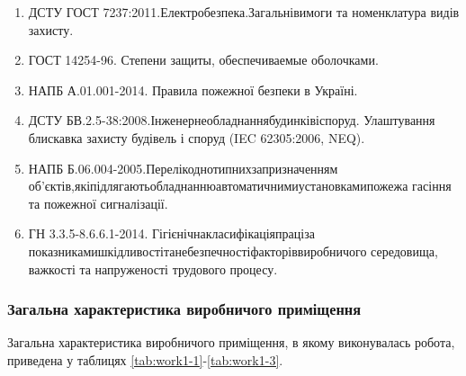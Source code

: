 \begin{enumerate}
	\item ДСТУ ГОСТ 7237:2011.\hfill Електробезпека.\hfill Загальні\hfill вимоги\newline \hspace*{-18mm} та номенклатура видів захисту.
	\item ГОСТ 14254-96. Степени защиты, обеспечиваемые оболочками.
	\item НАПБ А.01.001-2014. Правила пожежної безпеки в Україні.
	\item ДСТУ БВ.2.5-38:2008.\hfill Інженерне\hfill обладнання\hfill будинків\hfill і\hfill споруд.\newline \hspace*{-18mm} Улаштування блискавка захисту будівель і споруд (IEC 62305:2006, NEQ).
	\item НАПБ Б.06.004-2005.\hfill Перелік\hfill однотипних\hfill за\hfill призначенням\newline \hspace*{-18mm} об’єктів,\hfill які\hfill підлягають\hfill обладнанню\hfill автоматичними\hfill установками\hfill пожежа\newline \hspace*{-18mm} гасіння та пожежної сигналізації.
	\item ГН 3.3.5-8.6.6.1-2014. \hfill Гігієнічна\hfill класифікація\hfill праці\hfill за\newline \hspace*{-18mm} показниками\hfill шкідливості\hfill та\hfill небезпечності\hfill факторів\hfill виробничого\newline \hspace*{-18mm} середовища, важкості та напруженості трудового процесу.
\end{enumerate}

\subsubsection{Загальна характеристика виробничого приміщення}

Загальна характеристика виробничого приміщення, в якому виконувалась робота, приведена у таблицях \ref{tab:work1-1}-\ref{tab:work1-3}.

